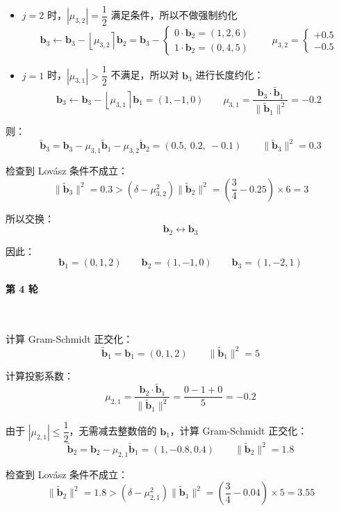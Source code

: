 \documentclass{article}
\begin{document}
\begin{itemize}
    \item $j=2$ 时，$|\mu_{3,2}|=\dfrac{1}{2}$ 满足条件，所以不做强制约化
    \[ \bm{b}_3\leftarrow\bm{b}_3-\left\lfloor\mu_{3,2}\right\rceil\bm{b}_2=\bm{b}_3-\begin{cases}
        0\cdot\bm{b}_2=(1,2,6)
        \\[7pt]
        1\cdot\bm{b}_2=(0,4,5)
    \end{cases}\qquad\mu_{3,2}=\begin{cases}
        +0.5
        \\[7pt]
        -0.5
    \end{cases} \]
    \item $j=1$ 时，$|\mu_{3,1}|>\dfrac{1}{2}$ 不满足，所以对 $\bm{b}_3$ 进行长度约化：
    \[ \bm{b}_3\leftarrow\bm{b}_3-\left\lfloor\mu_{3,1}\right\rceil\bm{b}_1=(1,-1,0)\qquad\mu_{3,1}=\dfrac{\bm{b}_3\cdot\tilde{\bm{b}}_1}{\|\tilde{\bm{b}}_1\|^2}=-0.2 \]
\end{itemize}

则：
\[ \tilde{\bm{b}}_3=\bm{b}_3-\mu_{3,1}\tilde{\bm{b}}_1-\mu_{3,2}\tilde{\bm{b}}_2=(0.5,\ 0.2,\ -0.1)\qquad\|\tilde{\bm{b}}_3\|^2=0.3 \]

检查到 Lov\'asz 条件不成立：
\[ \|\tilde{\bm{b}}_{3}\|^2=0.3>(\delta-\mu_{3,2}^2)\|\tilde{\bm{b}}_{2}\|^2=\left(\dfrac{3}{4}-0.25\right)\times6=3 \]

所以交换：
\[ \bm{b}_2\leftrightarrow\bm{b}_3 \]

因此：
\[ \bm{b}_1=(0,1,2)\qquad\bm{b}_2=(1,-1,0)\qquad\bm{b}_3=(1,-2,1) \]



\paragraph*{第 4 轮}~{}

计算 Gram-Schmidt 正交化：
\[ \tilde{\bm{b}}_1=\bm{b}_1=(0,1,2)\qquad \|\tilde{\bm{b}}_1\|^2=5 \]

计算投影系数：
\[ \mu_{2,1}=\dfrac{\bm{b}_2\cdot\tilde{\bm{b}}_1}{\|\tilde{\bm{b}}_1\|^2}=\dfrac{0-1+0}{5}=-0.2 \]

由于 $|\mu_{2,1}|\leqslant\dfrac{1}{2}$，无需减去整数倍的 $\bm{b}_1$，计算 Gram-Schmidt 正交化：
\[ \tilde{\bm{b}}_2=\bm{b}_2-\mu_{2,1}\tilde{\bm{b}}_1=(1,-0.8,0.4)\qquad\|\tilde{\bm{b}}_2\|^2=1.8 \]

检查到 Lov\'asz 条件不成立：
\[ \|\tilde{\bm{b}}_{2}\|^2=1.8>(\delta-\mu_{2,1}^2)\|\tilde{\bm{b}}_{1}\|^2=\left(\dfrac{3}{4}-0.04\right)\times5=3.55 \]
\end{document}
